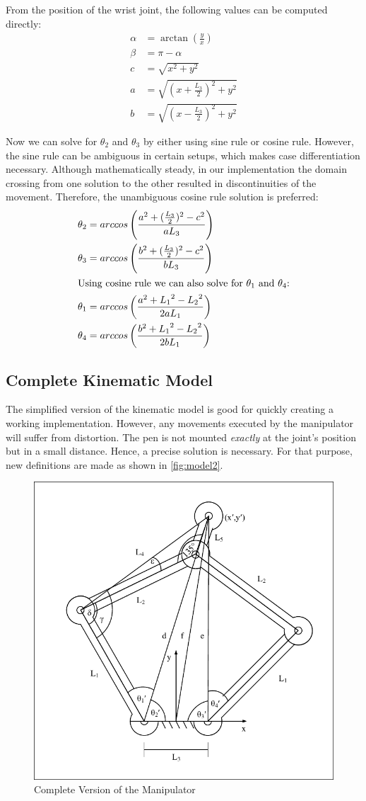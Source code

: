 \documentclass{sig-alternate-05-2015}
\begin{document}
From the position of the wrist joint, the following values can be computed directly:
\begin{align*}
\alpha &= \arctan \left( \frac{y}{x} \right) \\
\beta  &= \pi - \alpha \\
c      &= \sqrt{x^2 + y^2}\\
a      &= \sqrt{\left(x+ \frac{L_3}{2}\right)^2 + y^2}\\
b      &=\sqrt{\left(x- \frac{L_3}{2}\right)^2 + y^2}
\end{align*}

Now we can solve for $\theta_2$ and $\theta_3$ by either using sine rule or cosine rule. However, the sine rule can be ambiguous in certain setups, which makes case differentiation necessary. Although mathematically steady, in our implementation the domain crossing from one solution to the other resulted in discontinuities of the movement. Therefore, the unambiguous cosine rule solution is preferred:
\begin{align*}
\theta_2 &= arccos\left(  \frac{a^2 + (\frac{L_3}{2})^2 - c^2}{aL_3} \right)\\
\theta_3 &= arccos\left(  \frac{b^2 + (\frac{L_3}{2})^2 - c^2}{bL_3} \right)\\
\intertext{Using cosine rule we can also solve for $\theta_1$ and $\theta_4$:}
\theta_1 &= arccos\left(  \frac{a^2 + {L_1}^2 - {L_2}^2}{2aL_1} \right)\\
\theta_4 &= arccos\left(  \frac{b^2 + {L_1}^2 - {L_2}^2}{2bL_1} \right)
\end{align*}

\subsection{Complete Kinematic Model}
The simplified version of the kinematic model is good for quickly creating a working implementation. However, any movements executed by the manipulator will suffer from distortion. The pen is not mounted \emph{exactly} at the joint's position but in a small distance. Hence, a precise solution is necessary. For that purpose, new definitions are made as shown in \autoref{fig:model2}.
\begin{figure}[!h]
	\centering
	\includegraphics[width=.42\textwidth]{img/LinkDiagramComplicated.pdf}
	\caption{Complete Version of the Manipulator}\label{fig:model2}
\end{figure}
\end{document}

